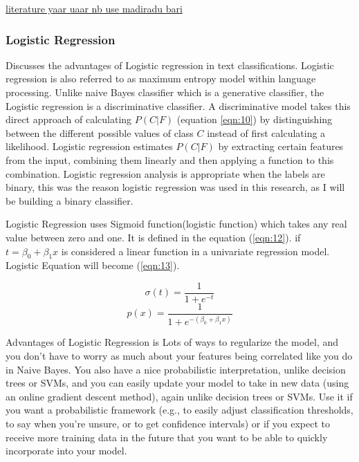 \underline{literature yaar uaar nb use madiradu bari} 

\subsubsection{Logistic Regression}

\cite{ManDaniel} Discusses the advantages of Logistic regression in text classifications. Logistic regression is also referred to as maximum entropy model within language processing. Unlike naive Bayes classifier which is a generative classifier, the Logistic regression is a discriminative classifier. A discriminative model takes this direct approach of calculating $P(C|F)$ (equation \ref{eqn:10}) by distinguishing between the different possible values of class $C$ instead of first calculating a likelihood. Logistic regression estimates $P(C|F)$ by extracting certain features from the input, combining them linearly and then applying a function to this combination. Logistic regression analysis is appropriate when the labels are binary, this was the reason logistic regression was used in this research, as I will be building a binary classifier. 

Logistic Regression uses Sigmoid function(logistic function) which takes any real value between zero and one. It is defined in the equation (\ref{eqn:12}). if $t= \beta_0 + \beta_1x$ is considered a linear function in a univariate regression model. Logistic Equation will become (\ref{eqn:13}). 




\begin{equation}
\label{eqn:12}
\sigma(t) = \frac{1}{1+e^{-t}}
\end{equation}
\begin{equation}
\label{eqn:13}
p(x) = \frac{1}{1 + e^{-(\beta_0 + \beta_1x)}}
\end{equation}



Advantages of Logistic Regression is Lots of ways to regularize the model, and you don’t have to worry as much about your features being correlated like you do in Naive Bayes. You also have a nice probabilistic interpretation, unlike decision trees or SVMs, and you can easily update your model to take in new data (using an online gradient descent method), again unlike decision trees or SVMs. Use it if you want a probabilistic framework (e.g., to easily adjust classification thresholds, to say when you’re unsure, or to get confidence intervals) or if you expect to receive more training data in the future that you want to be able to quickly incorporate into your model.

